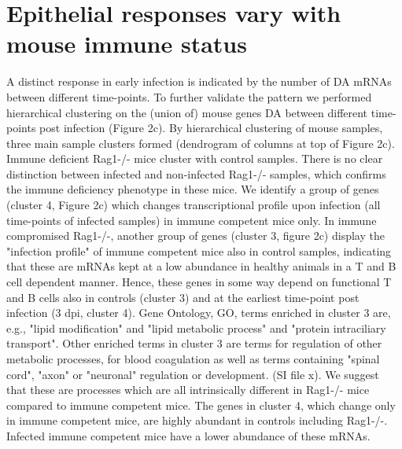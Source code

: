 \documentclass{bmcart}
\begin{document}
\section*{Epithelial responses vary with mouse immune status}
A distinct response in early infection is indicated by the number of DA mRNAs between different time-points. To further validate the pattern we performed hierarchical clustering on the (union of) mouse genes DA between different time-points post infection (Figure 2c). By hierarchical clustering of mouse samples, three main sample clusters formed (dendrogram of columns at top of Figure 2c). Immune deficient Rag1-/- mice cluster with control samples. There is no clear distinction between infected and non-infected Rag1-/- samples, which confirms the immune deficiency phenotype in these mice. 
We identify a group of genes (cluster 4, Figure 2c) which changes transcriptional profile upon infection (all time-points of infected samples) in immune competent mice only. In immune compromised Rag1-/-, another group of genes (cluster 3, figure 2c) display the "infection profile" of immune competent mice also in control samples, indicating that these are mRNAs kept at a low abundance in healthy animals in a T and B cell dependent manner. Hence, these genes in some way depend on functional T and B cells also in controls (cluster 3) and at the earliest time-point post infection (3 dpi, cluster 4). 
Gene Ontology, GO, terms enriched in cluster 3 are, e.g., "lipid modification" and "lipid metabolic process" and "protein intraciliary transport". Other enriched terms in cluster 3 are terms for regulation of other metabolic processes, for blood coagulation as well as terms containing "spinal cord", "axon" or "neuronal" regulation or development. (SI file x). We suggest that these are processes which are all intrinsically different in Rag1-/- mice compared to immune competent mice. The genes in cluster 4, which change only in immune competent mice, are highly abundant in controls including Rag1-/-. Infected immune competent mice have a lower abundance of these mRNAs.
\end{document}
